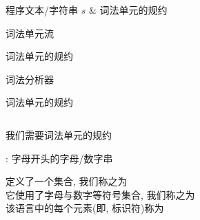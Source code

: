 
\begin{frame}{}
\end{frame}

\begin{frame}{}
  \begin{center}
     程序文本/字符串 $s$ \& 词法单元的规约

    \vspace{0.50cm}

    \vspace{0.30cm}
     词法单元流
  \end{center}
\end{frame}

\begin{frame}{}
  \begin{center}
     词法单元的规约

    \vspace{0.50cm}

    \vspace{0.30cm}
     词法分析器
  \end{center}
\end{frame}

\begin{frame}{}
  \begin{center}
    词法单元的规约

    \vspace{0.40cm}
    \begin{columns}
    \end{columns}

    \pause
    \vspace{0.60cm}
    我们需要词法单元的规约
  \end{center}
\end{frame}

\begin{frame}{}
  \begin{center}
    \id: 字母开头的字母/数字串

    \vspace{0.80cm}
    \id{} 定义了一个集合, 我们称之为 \\[15pt]
    它使用了字母与数字等符号集合, 我们称之为 \\[15pt]
    该语言中的每个元素(即, 标识符)称为
  \end{center}
\end{frame}

